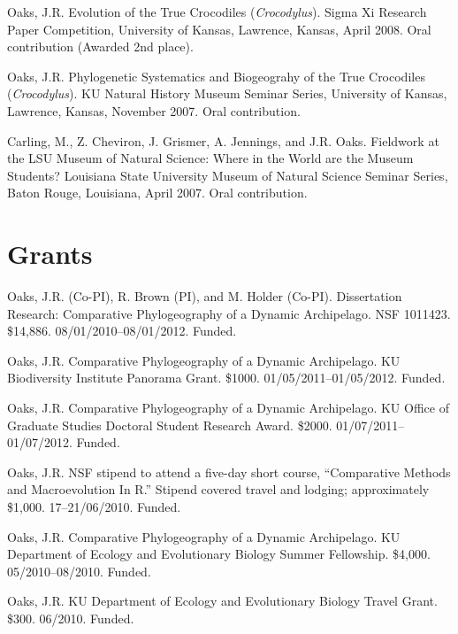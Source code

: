\documentclass[10pt]{article}
\newcommand{\ignore}[1]{}
\newcommand{\myHangIndent}{\hangindent=5mm}
\begin{document}
\myHangIndent
Oaks, J.R.
Evolution of the True Crocodiles (\emph{Crocodylus}).
Sigma Xi Research Paper Competition, University of Kansas, Lawrence, Kansas, April 2008.
Oral contribution (Awarded 2nd place).

\myHangIndent
Oaks, J.R.
Phylogenetic Systematics and Biogeograhy of the True Crocodiles (\emph{Crocodylus}).
KU Natural History Museum Seminar Series, University of Kansas, Lawrence, Kansas, November 2007.
Oral contribution.

\myHangIndent
Carling, M., Z. Cheviron, J. Grismer, A. Jennings, and J.R. Oaks.
Fieldwork at the LSU Museum of Natural Science: Where in the World are the Museum Students?
Louisiana State University Museum of Natural Science Seminar Series, Baton Rouge, Louisiana, April 2007.
Oral contribution.

\section*{Grants}
\myHangIndent
Oaks, J.R. (Co-PI), R. Brown (PI), and M. Holder (Co-PI).
Dissertation Research: Comparative Phylogeography of a Dynamic Archipelago.
NSF 1011423.
\$14,886.
08/01/2010--08/01/2012.
Funded.

\myHangIndent
Oaks, J.R.
Comparative Phylogeography of a Dynamic Archipelago.
KU Biodiversity Institute Panorama Grant.
\$1000.
01/05/2011--01/05/2012.
Funded.

\myHangIndent
Oaks, J.R.
Comparative Phylogeography of a Dynamic Archipelago.
KU Office of Graduate Studies Doctoral Student Research Award.
\$2000.
01/07/2011--01/07/2012.
Funded.

\ignore{
\myHangIndent
Oaks, J.R.
Comparative Phylogeography of a Dynamic Archipelago.
The Society for the Study of Evolution Rosemary Grant Graduate Research Award.
\$2,085.
01/07/2010--01/07/2011.
Not funded.
}
\myHangIndent
Oaks, J.R.
NSF stipend to attend a five-day short course, ``Comparative Methods and Macroevolution In R.''
Stipend covered travel and lodging; approximately \$1,000.
17--21/06/2010.
Funded.

\ignore{
\myHangIndent
Oaks, J.R.
Comparative Phylogeography of a Dynamic Archipelago.
KU Graduate Studies Summer Research Fellowship.
\$4,000.
05/2010--08/2010.
Not funded.
}
\myHangIndent
Oaks, J.R.
Comparative Phylogeography of a Dynamic Archipelago.
KU Department of Ecology and Evolutionary Biology Summer Fellowship.
\$4,000.
05/2010--08/2010.
Funded.

\myHangIndent
Oaks, J.R.
KU Department of Ecology and Evolutionary Biology Travel Grant.
\$300.
06/2010.
Funded.
\end{document}
